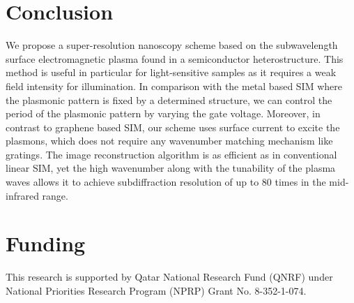 \documentclass[10pt]{article}
\renewcommand{\^}{\hat}  %
\renewcommand{\^}{\hat}  %
\begin{document}
\section{Conclusion}
%
We propose a super-resolution nanoscopy scheme based on the subwavelength surface electromagnetic plasma found in a semiconductor heterostructure. This method is useful in particular for light-sensitive samples as it requires a weak field intensity for illumination. In comparison with the metal based SIM where the plasmonic pattern is fixed by a determined structure, we can control the period of the plasmonic pattern by varying the gate voltage. Moreover, in contrast to graphene based SIM, our scheme uses surface current to excite the plasmons, which does not require any wavenumber matching mechanism like gratings. The image reconstruction algorithm is as efficient as in conventional linear SIM, yet the high wavenumber along with the tunability of the plasma waves allows it to achieve subdiffraction resolution of up to 80 times in the mid-infrared range.
%
\section*{Funding}
This research is supported by Qatar National Research Fund (QNRF) under National Priorities Research Program (NPRP) Grant No. 8-352-1-074.
\end{document}
